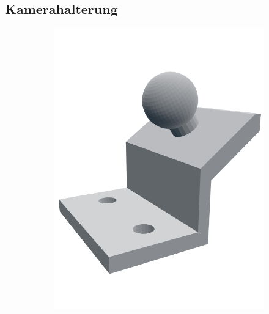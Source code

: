 \documentclass[a4paper, 12pt]{scrartcl}
\begin{document}
\subsection{Kamerahalterung}
\begin{figure}[ht!] \centering
	\begin{subfigure}{.33\textwidth} \centering
		\includegraphics[width=\textwidth]{../3D-Druck_Modelle/Kamerahalterung_neu.png}
	\end{subfigure}%
	\begin{subfigure}{.33\textwidth} \centering

\end{subfigure}
\end{figure}
\end{document}
